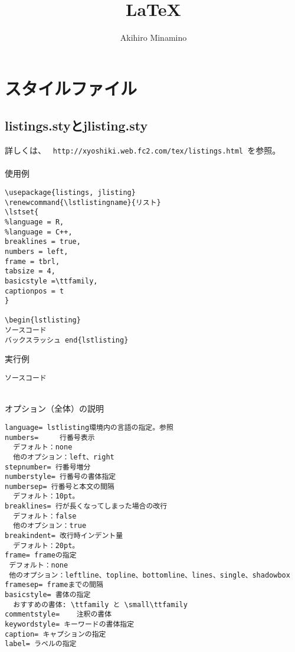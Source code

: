 \documentclass[11pt, oneside]{article}   	%
\title{\LaTeX}
\author{Akihiro Minamino}
\renewcommand{\lstlistingname}{リスト}
\begin{document}
\maketitle

\section{スタイルファイル}
\subsection{listings.styとjlisting.sty}
詳しくは、
\verb| http://xyoshiki.web.fc2.com/tex/listings.html |を参照。\\
　\\
使用例
\begin{lstlisting}
\usepackage{listings, jlisting}
\renewcommand{\lstlistingname}{リスト}
\lstset{
%language = R,
%language = C++,   
breaklines = true,
numbers = left,
frame = tbrl,
tabsize = 4,
basicstyle =\ttfamily,
captionpos = t
}

\begin{lstlisting}
ソースコード
バックスラッシュ end{lstlisting}
\end{lstlisting} 
実行例
\begin{lstlisting}
ソースコード
\end{lstlisting}
　\\
オプション（全体）の説明
\begin{lstlisting}
language= lstlisting環境内の言語の指定。参照
numbers=	 行番号表示
  デフォルト：none
  他のオプション：left、right
stepnumber= 行番号増分
numberstyle= 行番号の書体指定
numbersep= 行番号と本文の間隔
  デフォルト：10pt。
breaklines= 行が長くなってしまった場合の改行
  デフォルト：false
  他のオプション：true
breakindent= 改行時インデント量
  デフォルト：20pt。
frame= frameの指定
 デフォルト：none
 他のオプション：leftline、topline、bottomline、lines、single、shadowbox
framesep= frameまでの間隔
basicstyle= 書体の指定
  おすすめの書体: \ttfamily と \small\ttfamily
commentstyle=	 注釈の書体
keywordstyle= キーワードの書体指定
caption= キャプションの指定
label= ラベルの指定
\end{lstlisting}
\end{document}
